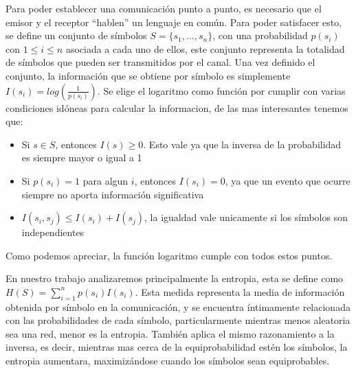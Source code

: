 Para poder establecer una comunicación punto a punto, es necesario que el emisor y el receptor "`hablen"' un lenguaje en común. Para poder satisfacer esto, se define un conjunto de símbolos $S = \{ s_1, ..., s_n \}$, con una probabilidad $p(s_i)$ con $1 \leq i \leq n$ asociada a cada uno de ellos, este conjunto representa la totalidad de símbolos que pueden ser transmitidos por el canal. Una vez definido el conjunto, la información que se obtiene por símbolo es simplemente $I(s_i) = log(\frac{1}{p(s_i)})$. Se elige el logaritmo como función por cumplir con varias condiciones idóneas para calcular la informacion, de las mas interesantes tenemos que:

\begin{itemize}
	\item Si $s \in S$, entonces $I(s) \geq 0$. Esto vale ya que la inversa de la probabilidad es siempre mayor o igual a 1
	\item Si $p(s_i) = 1$ para algun $i$, entonces $I(s_i) = 0$, ya que un evento que ocurre siempre no aporta información significativa
	\item $I(s_i, s_j) \leq I(s_i) + I(s_j)$, la igualdad vale unicamente si los símbolos son independientes
\end{itemize}

Como podemos apreciar, la función logaritmo cumple con todos estos puntos.

En nuestro trabajo analizaremos principalmente la entropia, esta se define como $H(S) = \sum\limits_{i=1}^n p(s_i)I(s_i)$. Esta medida representa la media de información obtenida por símbolo en la comunicación, y se encuentra íntimamente relacionada con las probabilidades de cada símbolo, particularmente mientras menos aleatoria sea una red, menor es la entropia. También aplica el mismo razonamiento a la inversa, es decir, mientras mas cerca de la equiprobabilidad estén los símbolos, la entropia aumentara, maximizándose cuando los símbolos sean equiprobables.


